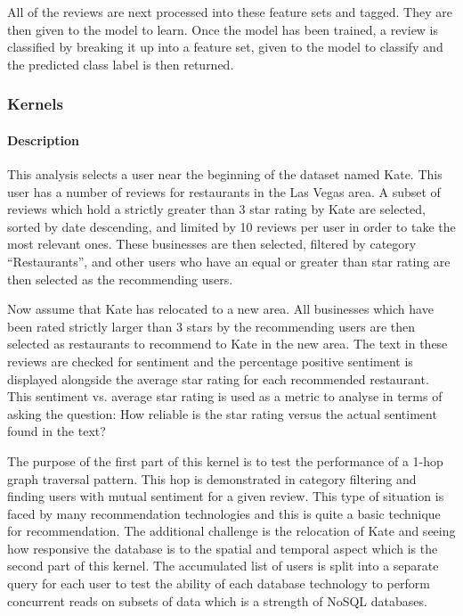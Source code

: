 All of the reviews are next processed into these feature sets and tagged. They are then given to the model to learn. Once the model has been trained, a review is classified by breaking it up into a feature set, given to the model to classify and the predicted class label is then returned.

\subsubsection{Kernels }
\label{sec:kernels}


\paragraph{Description}
This analysis selects a user near the beginning of the dataset named Kate. This user has a number of reviews for restaurants in the Las Vegas area. A subset of reviews which hold a strictly greater than 3 star rating by Kate are selected, sorted by date descending, and limited by 10 reviews per user in order to take the most relevant ones. These businesses are then selected, filtered by category ``Restaurants'', and other users who have an equal or greater than star rating are then selected as the recommending users.

Now assume that Kate has relocated to a new area. All businesses which have been rated strictly larger than 3 stars by the recommending users are then selected as restaurants to recommend to Kate in the new area. The text in these reviews are checked for sentiment and the percentage positive sentiment is displayed alongside the average star rating for each recommended restaurant. This sentiment vs. average star rating is used as a metric to analyse in terms of asking the question: How reliable is the star rating versus the actual sentiment found in the text?

The purpose of the first part of this kernel is to test the performance of a 1-hop graph traversal pattern. This hop is demonstrated in category filtering and finding users with mutual sentiment for a given review. This type of situation is faced by many recommendation technologies and this is quite a basic technique for recommendation. The additional challenge is the relocation of Kate and seeing how responsive the database is to the spatial and temporal aspect which is the second part of this kernel. The accumulated list of users is split into a separate query for each user to test the ability of each database technology to perform concurrent reads on subsets of data which is a strength of NoSQL databases.

